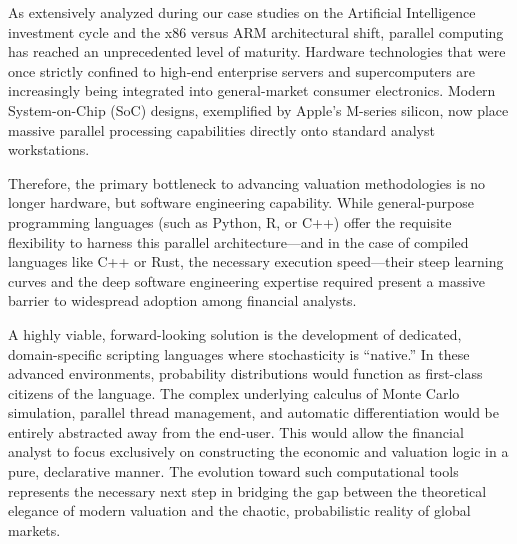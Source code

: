 As extensively analyzed during our case studies on the Artificial Intelligence investment cycle and the x86 versus ARM architectural shift, parallel computing has reached an unprecedented level of maturity. Hardware technologies that were once strictly confined to high-end enterprise servers and supercomputers are increasingly being integrated into general-market consumer electronics. Modern System-on-Chip (SoC) designs, exemplified by Apple's M-series silicon, now place massive parallel processing capabilities directly onto standard analyst workstations. 

Therefore, the primary bottleneck to advancing valuation methodologies is no longer hardware, but software engineering capability. While general-purpose programming languages (such as Python, R, or C++) offer the requisite flexibility to harness this parallel architecture—and in the case of compiled languages like C++ or Rust, the necessary execution speed—their steep learning curves and the deep software engineering expertise required present a massive barrier to widespread adoption among financial analysts.

A highly viable, forward-looking solution is the development of dedicated, domain-specific scripting languages where stochasticity is ``native.'' In these advanced environments, probability distributions would function as first-class citizens of the language. The complex underlying calculus of Monte Carlo simulation, parallel thread management, and automatic differentiation would be entirely abstracted away from the end-user. This would allow the financial analyst to focus exclusively on constructing the economic and valuation logic in a pure, declarative manner. The evolution toward such computational tools represents the necessary next step in bridging the gap between the theoretical elegance of modern valuation and the chaotic, probabilistic reality of global markets.